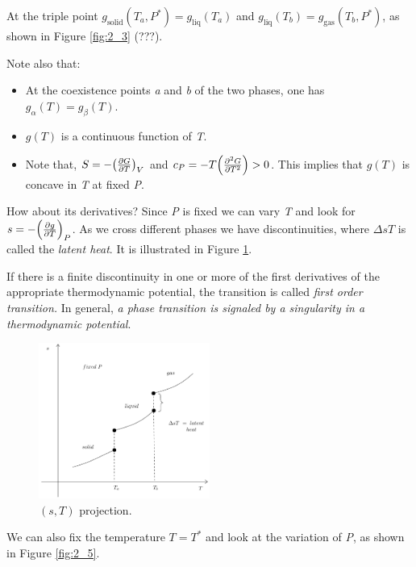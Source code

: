 \documentclass[../main/main.tex]{subfiles}
\begin{document}
At the triple point \( g_{\text{solid}}(T_ a, P^*) = g_{\text{liq}}(T_a) \) and \( g_{\text{liq}}(T_b) = g_{\text{gas}}(T_b , P^*) \), as shown in Figure \ref{fig:2_3} (???).

Note also that:
\begin{itemize}
\item At the coexistence points \emph{a} and \emph{b} of the two phases, one has \( g_ \alpha (T) = g_ \beta (T) \).
\item \( g(T) \) is a continuous function of \emph{T}.
\item Note that, \( S= -\qty(\pdv{G}{T} )_V  \)  and \( c_P = - T \qty(\pdv[2]{G}{T}) > 0 \). This implies that \( g(T) \) is concave in \emph{T} at fixed \emph{P}.
\end{itemize}

\noindent
How about its derivatives? Since \emph{P}  is fixed we can vary \emph{T}  and look for \( s=-\qty(\pdv{g}{T} )_P  \). As we cross different phases  we have discontinuities, where \( \Delta s T \)  is called the \emph{latent heat}. It is illustrated in Figure \ref{fig:2_4}.

If there is a finite discontinuity in one or more of the first derivatives of the appropriate thermodynamic potential, the transition is called \emph{first order transition.} In general, \emph{a phase transition is signaled by a singularity in a thermodynamic potential}.


\begin{figure}[h!]
\centering
\includegraphics[width=0.5\textwidth]{../lessons/2_image/4.pdf}
\caption{\label{fig:2_4} \( (s,T) \) projection. }
\end{figure}


We can also fix the temperature \( T=T^* \)  and look at the variation of \emph{P}, as shown in Figure \ref{fig:2_5}.
\end{document}
